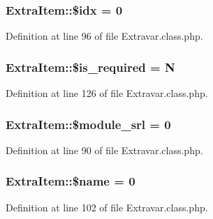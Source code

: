 \hypertarget{classExtraItem_aadcda4aa903481b261d86bc50ab1c238}{}
\subsubsection[{\$idx}]{\setlength{\rightskip}{0pt plus 5cm}Extra\+Item\+::\$idx = 0}\label{classExtraItem_aadcda4aa903481b261d86bc50ab1c238}


Definition at line 96 of file Extravar.\+class.\+php.

\hypertarget{classExtraItem_a616da9975ea87e9b61b6b9a2daf5e769}{}
\subsubsection[{\$is\+\_\+required}]{\setlength{\rightskip}{0pt plus 5cm}Extra\+Item\+::\$is\+\_\+required = \textquotesingle{}N\textquotesingle{}}\label{classExtraItem_a616da9975ea87e9b61b6b9a2daf5e769}


Definition at line 126 of file Extravar.\+class.\+php.

\hypertarget{classExtraItem_a21cce86c0846b13228273314216e5ab9}{}
\subsubsection[{\$module\+\_\+srl}]{\setlength{\rightskip}{0pt plus 5cm}Extra\+Item\+::\$module\+\_\+srl = 0}\label{classExtraItem_a21cce86c0846b13228273314216e5ab9}


Definition at line 90 of file Extravar.\+class.\+php.

\hypertarget{classExtraItem_a32694a2408e9e2cca1d680356cf937d3}{}
\subsubsection[{\$name}]{\setlength{\rightskip}{0pt plus 5cm}Extra\+Item\+::\$name = 0}\label{classExtraItem_a32694a2408e9e2cca1d680356cf937d3}


Definition at line 102 of file Extravar.\+class.\+php.

\hypertarget{classExtraItem_a086e30bc8e2d078ad1108d00ae58a60c}{}
